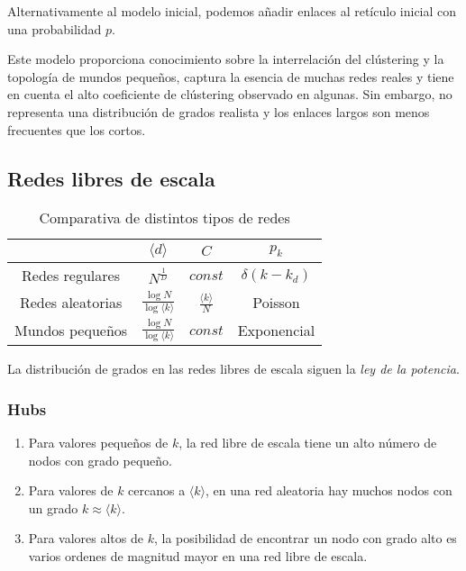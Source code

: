 \documentclass[10pt,spanish, landscape, twocolumn]{article}
\begin{document}
Alternativamente al modelo inicial, podemos añadir enlaces al retículo inicial con una probabilidad $p$.

Este modelo proporciona conocimiento sobre la interrelación del clústering y la topología de mundos pequeños, captura la esencia de muchas redes reales y tiene en cuenta el alto coeficiente de clústering observado en algunas. Sin embargo, no representa una distribución de grados realista y los enlaces largos son menos frecuentes que los cortos.

\subsection{\textcolor{temacinco}Redes libres de escala}

\begin{table}[!h]
\centering
\begin{tabular}{c | c | c | c}
& $\langle d \rangle$ & $C$ & $p_k$ \\
\hline
Redes regulares & $N^{\frac{1}{D}}$ &  $const$ & $\delta (k - k_d)$ \\
Redes aleatorias & $\frac{\log N}{\log \langle k \rangle}$ & $\frac{\langle k \rangle}{N}$ & Poisson \\
Mundos pequeños & $\frac{\log N}{\log \langle k \rangle}$ & $const$ & Exponencial \\ 
\end{tabular}
\caption{Comparativa de distintos tipos de redes}
\label{cmpred}
\end{table}

La distribución de grados en las redes libres de escala siguen la \textit{\textcolor{temacinco}{ley de la potencia}}.

\subsubsection{\textcolor{temacinco}Hubs}

\begin{enumerate}[\color{temacinco}{$\bullet$}]
    \item Para valores pequeños de $k$, la red libre de escala tiene un alto número de nodos con grado pequeño.
    \item Para valores de $k$ cercanos a $\langle k \rangle$, en una red aleatoria hay muchos nodos con un grado $k \approx \langle k \rangle$.
    \item Para valores altos de $k$, la posibilidad de encontrar un nodo con grado alto es varios ordenes de magnitud mayor en una red libre de escala.
\end{enumerate}
\end{document}
